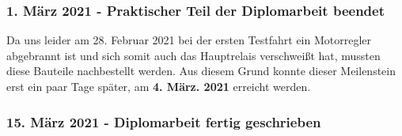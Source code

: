 \subsubsection*{1. März 2021 - Praktischer Teil der Diplomarbeit beendet}
Da uns leider am 28. Februar 2021 bei der ersten Testfahrt ein Motorregler abgebrannt ist und sich somit auch das Hauptrelais verschweißt hat, mussten
diese Bauteile nachbestellt werden. Aus diesem Grund konnte dieser Meilenstein erst ein paar Tage später, am \textbf{4. März. 2021} erreicht werden.  

\subsubsection*{15. März 2021 - Diplomarbeit fertig geschrieben}
